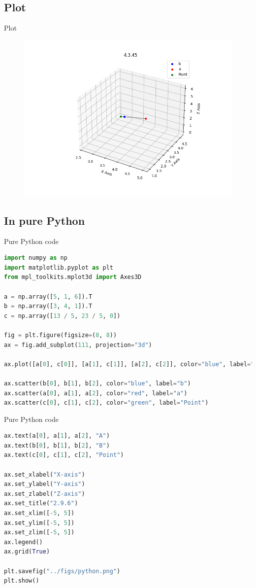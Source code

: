 \documentclass{beamer}
\theoremstyle{remark}
\numberwithin{equation}{section}
\begin{document}
\subsection{Plot}
\begin{frame}{Plot}
 \begin{figure}[H]
    \centering
    \includegraphics[width=0.8\columnwidth]{../figs/plot.png}
    \caption*{}
    \label{fig:plot}
\end{figure}
\end{frame}
\subsection{In pure Python}
\begin{frame}[fragile]{Pure Python code}
 \begin{lstlisting}[language=Python]
import numpy as np
import matplotlib.pyplot as plt
from mpl_toolkits.mplot3d import Axes3D

a = np.array([5, 1, 6]).T
b = np.array([3, 4, 1]).T
c = np.array([13 / 5, 23 / 5, 0])

fig = plt.figure(figsize=(8, 8))
ax = fig.add_subplot(111, projection="3d")

ax.plot([a[0], c[0]], [a[1], c[1]], [a[2], c[2]], color="blue", label="b")

ax.scatter(b[0], b[1], b[2], color="blue", label="b")
ax.scatter(a[0], a[1], a[2], color="red", label="a")
ax.scatter(c[0], c[1], c[2], color="green", label="Point")
 \end{lstlisting}
\end{frame}
\begin{frame}[fragile]{Pure Python code}
 \begin{lstlisting}[language=Python]
ax.text(a[0], a[1], a[2], "A")
ax.text(b[0], b[1], b[2], "B")
ax.text(c[0], c[1], c[2], "Point")

ax.set_xlabel("X-axis")
ax.set_ylabel("Y-axis")
ax.set_zlabel("Z-axis")
ax.set_title("2.9.6")
ax.set_xlim([-5, 5])
ax.set_ylim([-5, 5])
ax.set_zlim([-5, 5])
ax.legend()
ax.grid(True)

plt.savefig("../figs/python.png")
plt.show()
 \end{lstlisting}
\end{frame}
\end{document}
